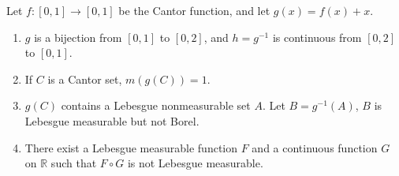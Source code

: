 \begin{exc}
    Let $f:[0,1]\rightarrow[0,1]$ be the Cantor function, 
    and let $g(x)=f(x)+x$.
    \begin{enumerate}
        \item $g$ is a bijection from $[0,1]$ to $[0,2]$, 
        and $h=g^{-1}$ is continuous from $[0,2]$ to $[0,1]$.
        \item If $C$ is a Cantor set, $m(g(C))=1$.
        \item $g(C)$ contains a Lebesgue nonmeasurable set $A$. 
        Let $B=g^{-1}(A)$, $B$ is Lebesgue measurable but not Borel.
        \item There exist a Lebesgue measurable function $F$ and a 
        continuous function $G$ on $\mathbb{R}$ such that 
        $F\circ G$ is not Lebesgue measurable.
    \end{enumerate}
\end{exc}
